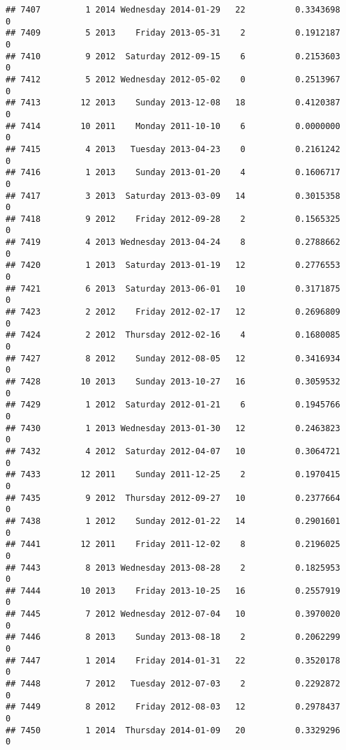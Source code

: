 \documentclass[
]{article}
\begin{document}
\begin{verbatim}
## 7407         1 2014 Wednesday 2014-01-29   22          0.3343698             0
## 7409         5 2013    Friday 2013-05-31    2          0.1912187             0
## 7410         9 2012  Saturday 2012-09-15    6          0.2153603             0
## 7412         5 2012 Wednesday 2012-05-02    0          0.2513967             0
## 7413        12 2013    Sunday 2013-12-08   18          0.4120387             0
## 7414        10 2011    Monday 2011-10-10    6          0.0000000             0
## 7415         4 2013   Tuesday 2013-04-23    0          0.2161242             0
## 7416         1 2013    Sunday 2013-01-20    4          0.1606717             0
## 7417         3 2013  Saturday 2013-03-09   14          0.3015358             0
## 7418         9 2012    Friday 2012-09-28    2          0.1565325             0
## 7419         4 2013 Wednesday 2013-04-24    8          0.2788662             0
## 7420         1 2013  Saturday 2013-01-19   12          0.2776553             0
## 7421         6 2013  Saturday 2013-06-01   10          0.3171875             0
## 7423         2 2012    Friday 2012-02-17   12          0.2696809             0
## 7424         2 2012  Thursday 2012-02-16    4          0.1680085             0
## 7427         8 2012    Sunday 2012-08-05   12          0.3416934             0
## 7428        10 2013    Sunday 2013-10-27   16          0.3059532             0
## 7429         1 2012  Saturday 2012-01-21    6          0.1945766             0
## 7430         1 2013 Wednesday 2013-01-30   12          0.2463823             0
## 7432         4 2012  Saturday 2012-04-07   10          0.3064721             0
## 7433        12 2011    Sunday 2011-12-25    2          0.1970415             0
## 7435         9 2012  Thursday 2012-09-27   10          0.2377664             0
## 7438         1 2012    Sunday 2012-01-22   14          0.2901601             0
## 7441        12 2011    Friday 2011-12-02    8          0.2196025             0
## 7443         8 2013 Wednesday 2013-08-28    2          0.1825953             0
## 7444        10 2013    Friday 2013-10-25   16          0.2557919             0
## 7445         7 2012 Wednesday 2012-07-04   10          0.3970020             0
## 7446         8 2013    Sunday 2013-08-18    2          0.2062299             0
## 7447         1 2014    Friday 2014-01-31   22          0.3520178             0
## 7448         7 2012   Tuesday 2012-07-03    2          0.2292872             0
## 7449         8 2012    Friday 2012-08-03   12          0.2978437             0
## 7450         1 2014  Thursday 2014-01-09   20          0.3329296             0

\end{verbatim}
\end{document}
